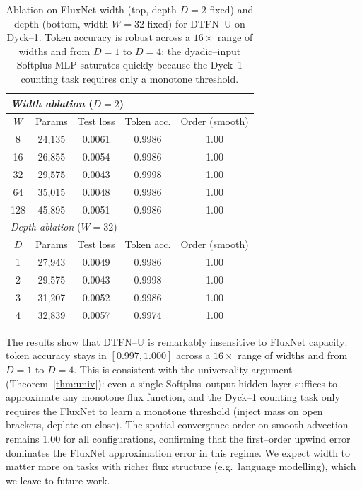 \documentclass[10pt]{article}
\theoremstyle{definition}
\theoremstyle{remark}
\begin{document}
\begin{table}[h]
  \centering
  \caption{Ablation on FluxNet width (top, depth $D=2$ fixed) and
    depth (bottom, width $W=32$ fixed) for DTFN--U on Dyck--1.  Token
    accuracy is robust across a $16\times$ range of widths and from
    $D=1$ to $D=4$; the dyadic--input Softplus MLP saturates quickly
    because the Dyck--1 counting task requires only a monotone
    threshold.}
  \label{tab:ablation-fluxnet}
  \begin{tabular}{ccccc}
    \toprule
    \multicolumn{5}{l}{\emph{Width ablation} ($D=2$)} \\
    \midrule
    $W$ & Params & Test loss & Token acc. & Order (smooth) \\
    \midrule
    8    & 24{,}135  & 0.0061 & 0.9986 & 1.00 \\
    16   & 26{,}855  & 0.0054 & 0.9986 & 1.00 \\
    32   & 29{,}575  & 0.0043 & 0.9998 & 1.00 \\
    64   & 35{,}015  & 0.0048 & 0.9986 & 1.00 \\
    128  & 45{,}895  & 0.0051 & 0.9986 & 1.00 \\
    \midrule
    \multicolumn{5}{l}{\emph{Depth ablation} ($W=32$)} \\
    \midrule
    $D$ & Params & Test loss & Token acc. & Order (smooth) \\
    \midrule
    1    & 27{,}943  & 0.0049 & 0.9986 & 1.00 \\
    2    & 29{,}575  & 0.0043 & 0.9998 & 1.00 \\
    3    & 31{,}207  & 0.0052 & 0.9986 & 1.00 \\
    4    & 32{,}839  & 0.0057 & 0.9974 & 1.00 \\
    \bottomrule
  \end{tabular}
\end{table}

The results show that DTFN--U is remarkably insensitive to FluxNet
capacity: token accuracy stays in $[0.997, 1.000]$ across a $16\times$
range of widths and from $D=1$ to $D=4$.  This is consistent with the
universality argument (Theorem~\ref{thm:univ}): even a single
Softplus--output hidden layer suffices to approximate any monotone
flux function, and the Dyck--1 counting task only requires the FluxNet
to learn a monotone threshold (inject mass on open brackets, deplete
on close).  The spatial convergence order on smooth advection remains
$1.00$ for all configurations, confirming that the first--order upwind
error dominates the FluxNet approximation error in this regime.  We
expect width to matter more on tasks with richer flux structure (e.g.\
language modelling), which we leave to future work.
\end{document}
